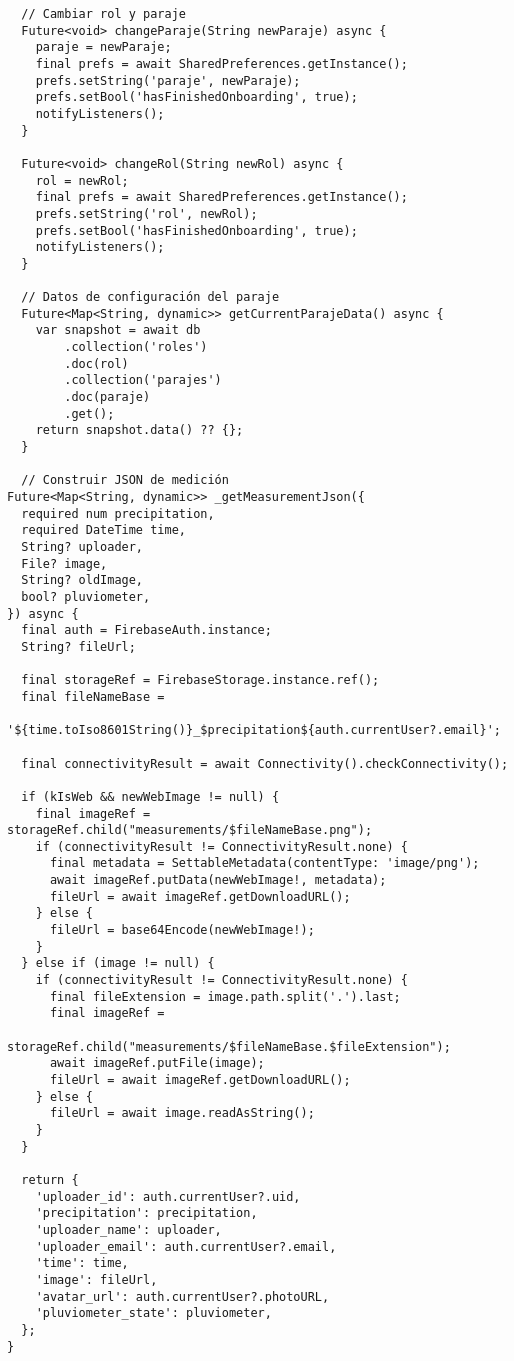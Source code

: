 \begin{verbatim}
  // Cambiar rol y paraje
  Future<void> changeParaje(String newParaje) async {
    paraje = newParaje;
    final prefs = await SharedPreferences.getInstance();
    prefs.setString('paraje', newParaje);
    prefs.setBool('hasFinishedOnboarding', true);
    notifyListeners();
  }

  Future<void> changeRol(String newRol) async {
    rol = newRol;
    final prefs = await SharedPreferences.getInstance();
    prefs.setString('rol', newRol);
    prefs.setBool('hasFinishedOnboarding', true);
    notifyListeners();
  }

  // Datos de configuración del paraje
  Future<Map<String, dynamic>> getCurrentParajeData() async {
    var snapshot = await db
        .collection('roles')
        .doc(rol)
        .collection('parajes')
        .doc(paraje)
        .get();
    return snapshot.data() ?? {};
  }

  // Construir JSON de medición
Future<Map<String, dynamic>> _getMeasurementJson({
  required num precipitation,
  required DateTime time,
  String? uploader,
  File? image,
  String? oldImage,
  bool? pluviometer,
}) async {
  final auth = FirebaseAuth.instance;
  String? fileUrl;

  final storageRef = FirebaseStorage.instance.ref();
  final fileNameBase =
      '${time.toIso8601String()}_$precipitation${auth.currentUser?.email}';

  final connectivityResult = await Connectivity().checkConnectivity();

  if (kIsWeb && newWebImage != null) {
    final imageRef = storageRef.child("measurements/$fileNameBase.png");
    if (connectivityResult != ConnectivityResult.none) {
      final metadata = SettableMetadata(contentType: 'image/png');
      await imageRef.putData(newWebImage!, metadata);
      fileUrl = await imageRef.getDownloadURL();
    } else {
      fileUrl = base64Encode(newWebImage!);
    }
  } else if (image != null) {
    if (connectivityResult != ConnectivityResult.none) {
      final fileExtension = image.path.split('.').last;
      final imageRef =
          storageRef.child("measurements/$fileNameBase.$fileExtension");
      await imageRef.putFile(image);
      fileUrl = await imageRef.getDownloadURL();
    } else {
      fileUrl = await image.readAsString();
    }
  }

  return {
    'uploader_id': auth.currentUser?.uid,
    'precipitation': precipitation,
    'uploader_name': uploader,
    'uploader_email': auth.currentUser?.email,
    'time': time,
    'image': fileUrl,
    'avatar_url': auth.currentUser?.photoURL,
    'pluviometer_state': pluviometer,
  };
}



\end{verbatim}
